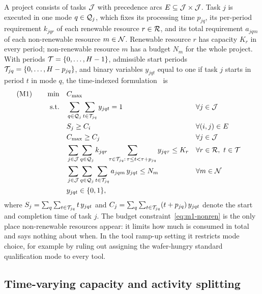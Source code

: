A project consists of tasks $\mathcal{J}$ with precedence arcs $E \subseteq \mathcal{J}
\times \mathcal{J}$. Task $j$ is executed in one mode $q \in \mathcal{Q}_j$, which fixes
its processing time $p_{jq}$, its per-period requirement $k_{jqr}$ of each
renewable resource $r \in \mathcal{R}$, and its total requirement $a_{jqm}$ of each
non-renewable resource $m \in \mathcal{N}$. Renewable resource $r$ has capacity
$K_r$ in every period; non-renewable resource $m$ has a budget $N_m$ for the
whole project. With periods $\mathcal{T} = \{0, \dots, H-1\}$, admissible start
periods $\mathcal{T}_{jq} = \{0, \dots, H - p_{jq}\}$, and binary variables
$y_{jqt}$ equal to one if task $j$ starts in period $t$ in mode $q$, the
time-indexed formulation~\citep{pritsker1969multiproject,talbot1982resource} is
\begin{align}
    \text{(M1)} \qquad \min \quad & C_{\max} \label{eq:m1-obj} \\
    \text{s.t.} \quad
    & \sum_{q \in \mathcal{Q}_j} \sum_{t \in \mathcal{T}_{jq}} y_{jqt} = 1
      && \forall j \in \mathcal{J} \label{eq:m1-assign} \\
    & S_j \ge C_i
      && \forall (i,j) \in E \label{eq:m1-prec} \\
    & C_{\max} \ge C_j
      && \forall j \in \mathcal{J} \label{eq:m1-cmax} \\
    & \sum_{j \in \mathcal{J}} \sum_{q \in \mathcal{Q}_j} k_{jqr}
      \sum_{\tau \in \mathcal{T}_{jq} :\, \tau \le t < \tau + p_{jq}} y_{jq\tau} \le K_r
      && \forall r \in \mathcal{R},\ t \in \mathcal{T} \label{eq:m1-res} \\
    & \sum_{j \in \mathcal{J}} \sum_{q \in \mathcal{Q}_j} \sum_{t \in \mathcal{T}_{jq}} a_{jqm}\, y_{jqt} \le N_m
      && \forall m \in \mathcal{N} \label{eq:m1-nonren} \\
    & y_{jqt} \in \{0,1\}, \label{eq:m1-dom}
\end{align}
where
$S_j = \sum_{q}\sum_{t \in \mathcal{T}_{jq}} t\, y_{jqt}$ and
$C_j = \sum_{q}\sum_{t \in \mathcal{T}_{jq}} (t + p_{jq})\, y_{jqt}$
denote the start and completion time of task $j$. The budget
constraint~\eqref{eq:m1-nonren} is the only place non-renewable resources
appear: it limits how much is consumed in total and says nothing about when.
In the tool ramp-up setting it restricts mode choice, for example by ruling
out assigning the wafer-hungry standard qualification mode to every tool.

\subsection{Time-varying capacity and activity splitting}\label{sec:pd-cheng}


